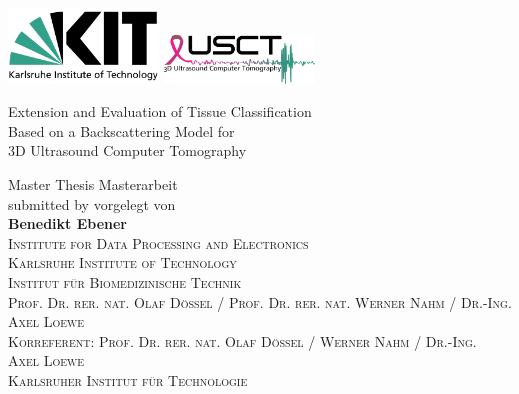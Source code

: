 \begin{titlingpage}
    \linespread{1.2}
\parindent0cm

\raggedright{ \includegraphics[width=4cm]{Graphics/KITlogo.pdf} \hfill \includegraphics[width=4cm]{Graphics/USCT crowdfunding logo_frutiger_FINAL.png} }

   \vspace{3cm}


\begin{minipage}[c]{15.5cm}
\begin{center}
   \begin{huge}
   \hspace{-1cm}
     Extension and Evaluation of Tissue Classification\\
   \hspace{-1cm}
     Based on a Backscattering Model for\\
   \hspace{-1cm}
      3D Ultrasound Computer Tomography\\
   \end{huge}
\end{center}
\end{minipage}
\vfill
\begin{minipage}[c]{15.5cm}
   \begin{center}

    {\Large
     \ifenglish
     Master Thesis
 	\else
    Masterarbeit
	\fi
	}\\

    \vspace{0.5cm}
     {\large
      \ifenglish
        submitted by
      \else
        vorgelegt von
      \fi
      }\\
    \vspace{0.5cm}
     \textbf{\Large Benedikt Ebener}
   \vspace{4cm} \\


 \textsc{
 \ifenglish
   Institute for Data Processing and Electronics\\
   Karlsruhe Institute of Technology\\
 \else
    Institut f\"ur Biomedizinische Technik\\
    Prof. Dr. rer. nat. Olaf D\"ossel / Prof. Dr. rer. nat. Werner Nahm / Dr.-Ing. Axel Loewe\\
    Korreferent: Prof. Dr. rer. nat. Olaf D\"ossel / Werner Nahm / Dr.-Ing. Axel Loewe\\
    Karlsruher Institut f\"ur Technologie\\
 \fi
 }


\end{center}
\end{minipage}
\end{titlingpage}

